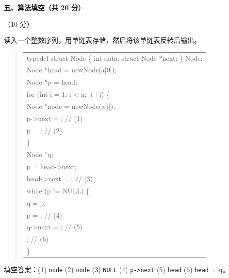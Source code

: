 \textbf{五、算法填空（共 20 分）}

\begin{question}[单链表反转]（10 分）

读入一个整数序列，用单链表存储，然后将该单链表反转后输出。

\begin{quote}
\footnotesize
\begin{tabular}{@{}l@{}}
typedef struct Node \{ int data; struct Node *next; \} Node;\\
Node *head = newNode(a[0]);\\
Node *p = head;\\
for (int i = 1; i < n; ++i) \{\\
    Node *node = newNode(a[i]);\\
    p->next = \underline{\hspace{10em}}; // (1)\\
    p = \underline{\hspace{10em}};       // (2)\\
\}\\
Node *q;\\
p = head->next;\\
head->next = \underline{\hspace{10em}}; // (3)\\
while (p != NULL) \{\\
    q = p;\\
    p = \underline{\hspace{10em}};       // (4)\\
    q->next = \underline{\hspace{10em}}; // (5)\\
    \underline{\hspace{10em}};           // (6)\\
\}\end{tabular}
\end{quote}

\begin{solution}
填空答案：(1) \texttt{node} (2) \texttt{node} (3) \texttt{NULL} (4) \texttt{p->next} (5) \texttt{head} (6) \texttt{head = q}。
\end{solution}
\end{question}

